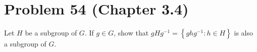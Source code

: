 \documentclass[cm, 10pt]{article}
\newcommand{\set}[1]{\ensuremath{ \left\{ #1 \right\} }}
\begin{document}
    \hrulefill %

    \clearpage


    \section*{Problem 54 (Chapter 3.4)}
      Let $H$ be a subgroup of $G$. If $g \in G$, show that $gHg^{-1}
      = \set{ghg^{-1} : h \in H}$ is also a subgroup of $G$.

    \hrulefill
\end{document}
